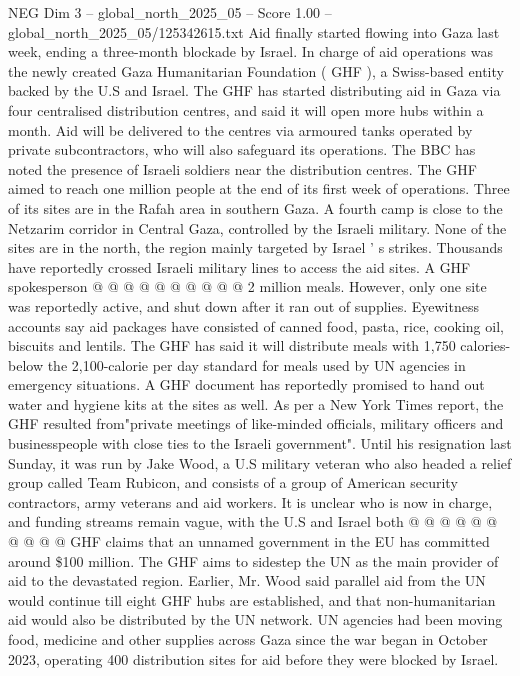 \begin{textsample}{NEG Dim 3 – global\_north\_2025\_05 – Score 1.00 – global\_north\_2025\_05/125342615.txt}  \label{ex:f3_neg_325}
Aid finally started flowing into Gaza last week, ending a three-month blockade by Israel.
In charge of aid operations was the newly created Gaza Humanitarian Foundation ( GHF ), a Swiss-based entity backed by the U.S and Israel.
The GHF has started distributing aid in Gaza via four centralised distribution centres, and said it will open more hubs within a month.
Aid will be delivered to the centres via armoured tanks operated by private subcontractors, who will also safeguard its operations.
The BBC has noted the presence of Israeli soldiers near the distribution centres.
The GHF aimed to reach one million people at the end of its first week of operations.
Three of its sites are in the Rafah area in southern Gaza.
A fourth camp is close to the Netzarim corridor in Central Gaza, controlled by the Israeli military.
None of the sites are in the north, the region mainly targeted by Israel ' s strikes.
Thousands have reportedly crossed Israeli military lines to access the aid sites.
A GHF spokesperson @ @ @ @ @ @ @ @ @ @ 2 million meals.
However, only one site was reportedly active, and shut down after it ran out of supplies.
Eyewitness accounts say aid packages have consisted of canned food, pasta, rice, cooking oil, biscuits and lentils.
The GHF has said it will distribute meals with 1,750 calories- below the 2,100-calorie per day standard for meals used by UN agencies in emergency situations.
A GHF document has reportedly promised to hand out water and hygiene kits at the sites as well.
As per a New York Times report, the GHF resulted from"private meetings of like-minded officials, military officers and businesspeople with close ties to the Israeli government".
Until his resignation last Sunday, it was run by Jake Wood, a U.S military veteran who also headed a relief group called Team Rubicon, and consists of a group of American security contractors, army veterans and aid workers.
It is unclear who is now in charge, and funding streams remain vague, with the U.S and Israel both @ @ @ @ @ @ @ @ @ @ GHF claims that an unnamed government in the EU has committed around \$100 million.
The GHF aims to sidestep the UN as the main provider of aid to the devastated region.
Earlier, Mr.
Wood said parallel aid from the UN would continue till eight GHF hubs are established, and that non-humanitarian aid would also be distributed by the UN network.
UN agencies had been moving food, medicine and other supplies across Gaza since the war began in October 2023, operating 400 distribution sites for aid before they were blocked by Israel.

\end{textsample}
